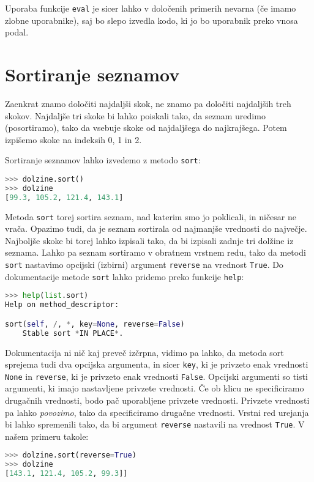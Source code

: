 Uporaba funkcije \texttt{eval} je sicer lahko v določenih primerih nevarna (če imamo zlobne uporabnike), saj bo slepo izvedla kodo, ki jo bo uporabnik preko vnosa podal.

\section{Sortiranje seznamov}

Zaenkrat znamo določiti najdaljši skok, ne znamo pa določiti najdaljših treh skokov. Najdaljše tri skoke bi lahko poiskali tako, da seznam uredimo (posortiramo), tako da vsebuje skoke od najdaljšega do najkrajšega. Potem izpišemo skoke na indeksih 0, 1 in 2. 

Sortiranje seznamov lahko izvedemo z metodo \texttt{sort}:
\begin{lstlisting}[language=Python, showstringspaces=false]
>>> dolzine.sort()
>>> dolzine
[99.3, 105.2, 121.4, 143.1]
\end{lstlisting}
Metoda \texttt{sort} torej sortira seznam, nad katerim smo jo poklicali, in ničesar ne vrača. Opazimo tudi, da je seznam sortirala od najmanjše vrednosti do največje. Najboljše skoke bi torej lahko izpisali tako, da bi izpisali zadnje tri dolžine iz seznama. Lahko pa seznam sortiramo v obratnem vrstnem redu, tako da metodi \texttt{sort} nastavimo opcijski (izbirni) argument \texttt{reverse} na vrednost \texttt{True}. Do dokumentacije metode \texttt{sort} lahko pridemo preko funkcije \texttt{help}:
\begin{lstlisting}[language=Python, showstringspaces=false]
>>> help(list.sort)
Help on method_descriptor:

sort(self, /, *, key=None, reverse=False)
    Stable sort *IN PLACE*.
\end{lstlisting}
Dokumentacija ni nič kaj preveč izčrpna, vidimo pa lahko, da metoda sort sprejema tudi dva opcijska argumenta, in sicer \texttt{key}, ki je privzeto enak vrednosti \texttt{None} in \texttt{reverse}, ki je privzeto enak vrednosti \texttt{False}. Opcijski argumenti so tisti argumenti, ki imajo nastavljene privzete vrednosti. Če ob klicu ne specificiramo drugačnih vrednosti, bodo pač uporabljene privzete vrednosti. Privzete vrednosti pa lahko \emph{povozimo}, tako da specificiramo drugačne vrednosti. Vrstni red urejanja bi lahko spremenili tako, da bi argument \texttt{reverse} nastavili na vrednost \texttt{True}. V našem primeru takole:
\begin{lstlisting}[language=Python, showstringspaces=false]
>>> dolzine.sort(reverse=True)
>>> dolzine
[143.1, 121.4, 105.2, 99.3]]
\end{lstlisting}

